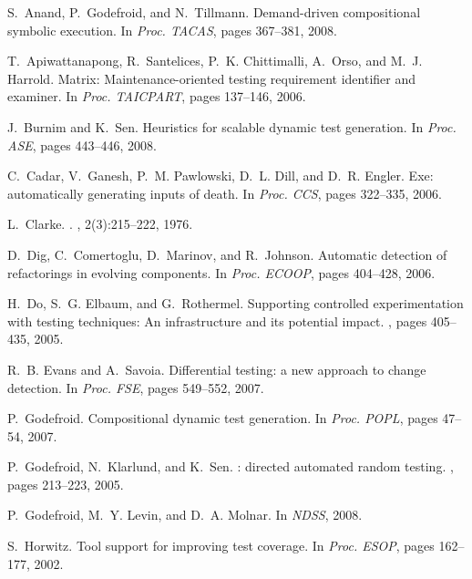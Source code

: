 \documentclass{sig-alternate}
\begin{document}
\begin{thebibliography}{10}
\begin{scriptsize}

S.~Anand, P.~Godefroid, and N.~Tillmann.
\newblock Demand-driven compositional symbolic execution.
\newblock In {\em Proc. TACAS}, pages 367--381, 2008.

T.~Apiwattanapong, R.~Santelices, P.~K. Chittimalli, A.~Orso, and M.~J.
  Harrold.
\newblock Matrix: Maintenance-oriented testing requirement identifier and
  examiner.
\newblock In {\em Proc. TAICPART}, pages 137--146, 2006.

J.~Burnim and K.~Sen.
\newblock Heuristics for scalable dynamic test generation.
\newblock In {\em Proc. ASE}, pages 443--446, 2008.

C.~Cadar, V.~Ganesh, P.~M. Pawlowski, D.~L. Dill, and D.~R. Engler.
\newblock Exe: automatically generating inputs of death.
\newblock In {\em Proc. CCS}, pages 322--335, 2006.

L.~Clarke.
.
, 2(3):215--222, 1976.

D.~Dig, C.~Comertoglu, D.~Marinov, and R.~Johnson.
\newblock Automatic detection of refactorings in evolving components.
\newblock In {\em Proc. ECOOP}, pages 404--428, 2006.

H.~Do, S.~G. Elbaum, and G.~Rothermel.
\newblock Supporting controlled experimentation with testing techniques: An
  infrastructure and its potential impact.
, pages 405--435, 2005.

R.~B. Evans and A.~Savoia.
\newblock Differential testing: a new approach to change detection.
\newblock In {\em Proc. FSE}, pages 549--552, 2007.

P.~Godefroid.
\newblock Compositional dynamic test generation.
\newblock In {\em Proc. POPL}, pages 47--54, 2007.

P.~Godefroid, N.~Klarlund, and K.~Sen.
: directed automated random testing.
, pages 213--223, 2005.

P.~Godefroid, M.~Y. Levin, and D.~A. Molnar.
\newblock In {\em NDSS}, 2008.

S.~Horwitz.
\newblock Tool support for improving test coverage.
\newblock In {\em Proc. ESOP}, pages 162--177, 2002.


\end{scriptsize}
\end{thebibliography}
\end{document}
